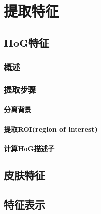 

\chapter{提取特征}
\section{HoG特征}
\subsection{概述}

\subsection{提取步骤}
\subsubsection{分离背景}

\subsubsection{提取ROI(region of interest)}

\subsubsection{计算HoG描述子}

\section{皮肤特征}

\section{特征表示} 